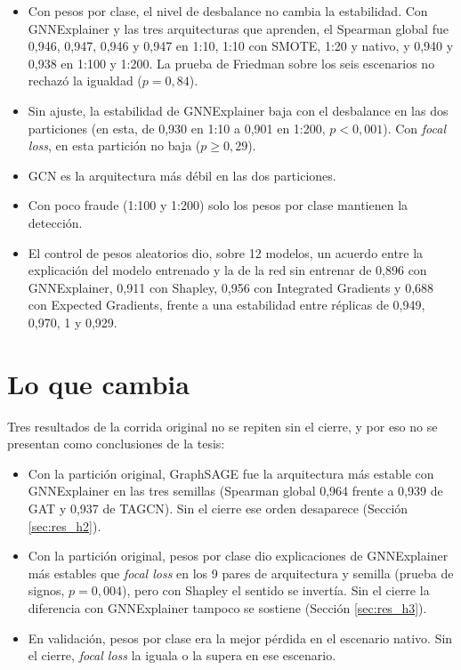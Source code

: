 \begin{itemize}
  \item Con pesos por clase, el nivel de desbalance no cambia la estabilidad. Con GNNExplainer y
        las tres arquitecturas que aprenden, el Spearman global fue 0,946, 0,947, 0,946 y
        0,947 en 1:10, 1:10 con SMOTE, 1:20 y nativo, y 0,940 y 0,938 en 1:100 y 1:200. La
        prueba de Friedman sobre los seis escenarios no rechazó la igualdad ($p = 0{,}84$).
  \item Sin ajuste, la estabilidad de GNNExplainer baja con el desbalance en las dos
        particiones (en esta, de 0,930 en 1:10 a 0,901 en 1:200, $p < 0{,}001$). Con
        \textit{focal loss}, en esta partición no baja ($p \geq 0{,}29$).
  \item GCN es la arquitectura más débil en las dos particiones.
  \item Con poco fraude (1:100 y 1:200) solo los pesos por clase mantienen la detección.
  \item El control de pesos aleatorios dio, sobre 12 modelos, un acuerdo entre la explicación
        del modelo entrenado y la de la red sin entrenar de 0,896 con GNNExplainer, 0,911 con
        Shapley, 0,956 con Integrated Gradients y 0,688 con Expected Gradients, frente a una
        estabilidad entre réplicas de 0,949, 0,970, 1 y 0,929.
\end{itemize}

\section{Lo que cambia}

Tres resultados de la corrida original no se repiten sin el cierre, y por eso no se presentan
como conclusiones de la tesis:

\begin{itemize}
  \item Con la partición original, GraphSAGE fue la arquitectura más estable con GNNExplainer
        en las tres semillas (Spearman global 0,964 frente a 0,939 de GAT y 0,937 de TAGCN). Sin
        el cierre ese orden desaparece (Sección \ref{sec:res_h2}).
  \item Con la partición original, pesos por clase dio explicaciones de GNNExplainer más
        estables que \textit{focal loss} en los 9 pares de arquitectura y semilla (prueba de
        signos, $p = 0{,}004$), pero con Shapley el sentido se invertía. Sin el cierre la
        diferencia con GNNExplainer tampoco se sostiene (Sección \ref{sec:res_h3}).
  \item En validación, pesos por clase era la mejor pérdida en el escenario nativo. Sin el
        cierre, \textit{focal loss} la iguala o la supera en ese escenario.
\end{itemize}

